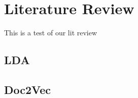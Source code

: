 
\section{Literature Review} \label{section:algorithms}
This is a test of our lit review

\subsection{LDA}

\subsection{Doc2Vec}